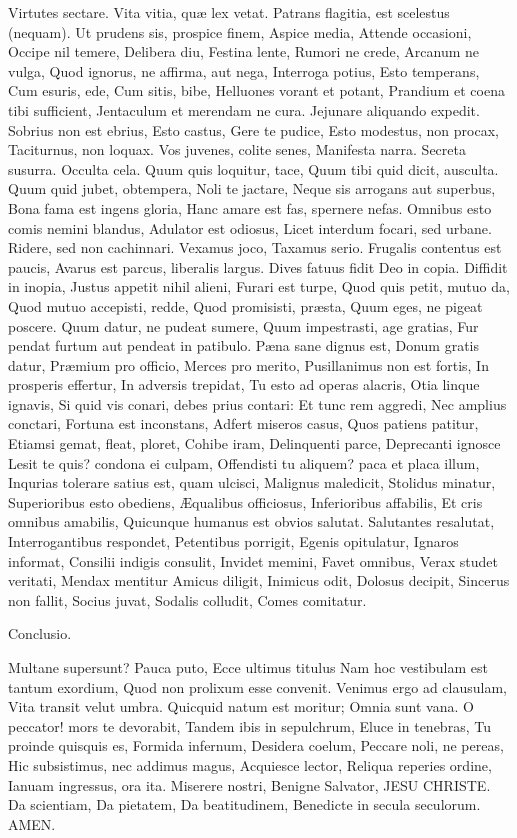 Virtutes sectare.
Vita vitia, quæ lex vetat.
Patrans flagitia, est scelestus (nequam).
Ut prudens sis, prospice finem,
Aspice media,
Attende occasioni,
Occipe nil temere,
Delibera diu,
Festina lente,
Rumori ne crede,
Arcanum ne vulga,
Quod ignorus, ne affirma, aut nega,
Interroga potius,
Esto temperans,
Cum esuris, ede,
Cum sitis, bibe,
Helluones vorant et potant,
Prandium et coena tibi sufficient,
Jentaculum et merendam ne cura.
Jejunare aliquando expedit.
Sobrius non est ebrius,
Esto castus,
Gere te pudice,
Esto modestus, non procax,
Taciturnus, non loquax.
Vos juvenes, colite senes,
Manifesta narra.
Secreta susurra.
Occulta cela.
Quum quis loquitur, tace,
Quum tibi quid dicit, ausculta.
Quum quid jubet, obtempera,
Noli te jactare,
Neque sis arrogans aut superbus,
Bona fama est ingens gloria,
Hanc amare est fas,
spernere nefas.
Omnibus esto comis nemini blandus,
Adulator est odiosus,
Licet interdum focari, sed urbane.
Ridere, sed non cachinnari.
Vexamus joco,
Taxamus serio.
Frugalis contentus est paucis,
Avarus est parcus, liberalis largus.
Dives fatuus fidit Deo in copia.
Diffidit in inopia,
Justus appetit nihil alieni,
Furari est turpe,
Quod quis petit, mutuo da,
Quod mutuo accepisti, redde,
Quod promisisti, præsta,
Quum eges, ne pigeat poscere.
Quum datur, ne pudeat sumere,
Quum impestrasti, age gratias,
Fur pendat furtum aut pendeat in patibulo.
Pæna sane dignus est,
Donum gratis datur,
Præmium pro officio,
Merces pro merito,
Pusillanimus non est fortis,
In prosperis effertur,
In adversis trepidat,
Tu esto ad operas alacris,
Otia linque ignavis,
Si quid vis conari, debes prius contari:
Et tunc rem aggredi,
Nec amplius conctari,
Fortuna est inconstans,
Adfert miseros casus,
Quos patiens patitur,
Etiamsi gemat, fleat, ploret,
Cohibe iram,
Delinquenti parce,
Deprecanti ignosce
Lesit te quis? condona ei culpam,
Offendisti tu aliquem? paca et placa illum,
Inqurias tolerare satius est, quam ulcisci,
Malignus maledicit,
Stolidus minatur,
Superioribus esto obediens,
Æqualibus officiosus,
Inferioribus affabilis,
Et cris omnibus amabilis,
Quicunque humanus est obvios salutat.
Salutantes resalutat,
Interrogantibus respondet,
Petentibus porrigit,
Egenis opitulatur,
Ignaros informat,
Consilii indigis consulit,
Invidet memini,
Favet omnibus,
Verax studet veritati,
Mendax mentitur
Amicus diligit,
Inimicus odit,
Dolosus decipit,
Sincerus non fallit,
Socius juvat,
Sodalis colludit,
Comes comitatur.

Conclusio.

Multane supersunt?
Pauca puto,
Ecce ultimus titulus 
Nam hoc vestibulam est tantum exordium,
Quod non prolixum esse convenit.
Venimus ergo ad clausulam,
Vita transit velut umbra.
Quicquid natum est moritur;
Omnia sunt vana.
O peccator! mors te devorabit,
Tandem ibis in sepulchrum,
Eluce in tenebras,
Tu proinde quisquis es,
Formida infernum,
Desidera coelum,
Peccare noli, ne pereas,
Hic subsistimus, nec addimus magus,
Acquiesce lector,
Reliqua reperies ordine,
Ianuam ingressus, ora ita.
Miserere nostri,
Benigne Salvator,
JESU CHRISTE.
Da scientiam,
Da pietatem,
Da beatitudinem,
Benedicte in secula seculorum.
AMEN.
 
